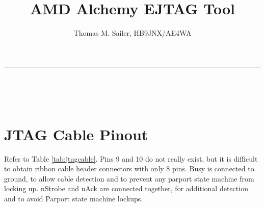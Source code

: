 \documentclass[a4paper,10pt,pdftex]{article}
\begin{document}
\sloppy

\title{AMD Alchemy EJTAG Tool}
\author{Thomas M. Sailer, HB9JNX/AE4WA}

%
\makeatletter
\newpage\thispagestyle{empty}
\noindent\begin{minipage}{\textwidth}
  \flushright
  {\sffamily\bfseries\Huge\@title}
  \noindent\rule[-1ex]{\textwidth}{5pt}\\[5ex]
  {\sffamily\Large\@author}\\[1.5ex]
  {\sffamily\Large\@date}\\[5ex]
\end{minipage}
\makeatother
%
\tableofcontents

\section{JTAG Cable Pinout}

Refer to Table \ref{tab:jtagcable}. Pins 9 and 10 do not really
exist, but it is difficult to obtain ribbon cable header connectors
with only 8 pins. Busy is connected to ground, to allow cable
detection and to prevent any parport state machine from locking
up. nStrobe and nAck are connected together, for additional detection
and to avoid Parport state machine lockups.

\newcommand\negsig[1]{$\overline{\textrm{#1}}$}
\end{document}
